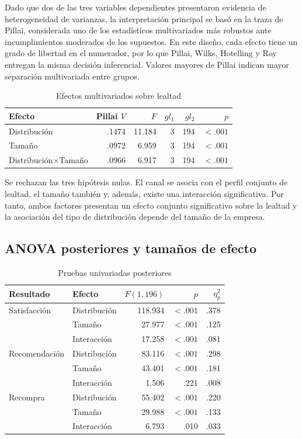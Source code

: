 \documentclass[12pt,letterpaper]{article}
\begin{document}
Dado que dos de las tres variables dependientes presentaron evidencia de heterogeneidad de varianzas, la interpretación principal se basó en la traza de Pillai, considerada uno de los estadísticos multivariados más robustos ante incumplimientos moderados de los supuestos. En este diseño, cada efecto tiene un grado de libertad en el numerador, por lo que Pillai, Wilks, Hotelling y Roy entregan la misma decisión inferencial. Valores mayores de Pillai indican mayor separación multivariada entre grupos.

\begin{table}[H]
\centering
\caption{Efectos multivariados sobre lealtad}
\begin{tabular}{lrrrrr}
\toprule
Efecto & Pillai $V$ & $F$ & $gl_1$ & $gl_2$ & $p$ \\
\midrule
Distribución & .1474 & 11.184 & 3 & 194 & $<.001$ \\
Tamaño & .0972 & 6.959 & 3 & 194 & $<.001$ \\
Distribución$\times$Tamaño & .0966 & 6.917 & 3 & 194 & $<.001$ \\
\bottomrule
\end{tabular}
\end{table}

Se rechazan las tres hipótesis nulas. El canal se asocia con el perfil conjunto de lealtad, el tamaño también y, además, existe una interacción significativa. Por tanto, ambos factores presentan un efecto conjunto significativo sobre la lealtad y la asociación del tipo de distribución depende del tamaño de la empresa.

\subsection{ANOVA posteriores y tamaños de efecto}

\begin{table}[H]
\centering
\caption{Pruebas univariadas posteriores}
\begin{tabular}{llrrr}
\toprule
Resultado & Efecto & $F(1,196)$ & $p$ & $\eta_p^2$ \\
\midrule
Satisfacción & Distribución & 118.934 & $<.001$ & .378 \\
 & Tamaño & 27.977 & $<.001$ & .125 \\
 & Interacción & 17.258 & $<.001$ & .081 \\
\midrule
Recomendación & Distribución & 83.116 & $<.001$ & .298 \\
 & Tamaño & 43.401 & $<.001$ & .181 \\
 & Interacción & 1.506 & .221 & .008 \\
\midrule
Recompra & Distribución & 55.402 & $<.001$ & .220 \\
 & Tamaño & 29.988 & $<.001$ & .133 \\
 & Interacción & 6.793 & .010 & .033 \\
\bottomrule
\end{tabular}
\end{table}
\end{document}

